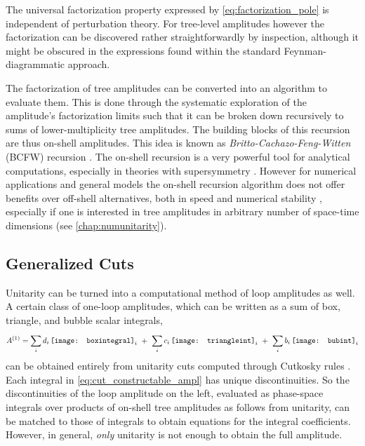 The universal factorization  property expressed by \cref{eq:factorization_pole} is independent of perturbation theory. 
For tree-level amplitudes however the factorization can be discovered rather straightforwardly by inspection,
although it might be obscured in the expressions found within the standard Feynman-diagrammatic approach.

The factorization of tree amplitudes can be converted into an algorithm to evaluate them.
This is done through the systematic exploration of the amplitude's factorization limits such that
it can be broken down recursively to sums of lower-multiplicity tree amplitudes. 
The building blocks of this recursion are thus on-shell amplitudes.
This idea is known as \emph{Britto-Cachazo-Feng-Witten} (BCFW) recursion \cite{Britto2005c,Britto2005f}.
The on-shell recursion is a very powerful tool for analytical computations, especially 
in theories with supersymmetry \cite{Dixon:2010ik,Drummond:2008cr,Bourjaily:2010wh}.
However for numerical applications and general models the on-shell recursion algorithm
does not offer benefits over off-shell alternatives, both in speed and numerical stability \cite{Duhr:2006iq,Drummond:2008cr,Badger:2012uz},
especially if one is interested in tree amplitudes in arbitrary number of space-time dimensions (see \cref{chap:numunitarity}). 


\subsection{Generalized Cuts}

Unitarity can be turned into a computational method of loop amplitudes as well.
A certain class of one-loop amplitudes, which
can be written as a sum of box, triangle, and bubble scalar integrals,
\begin{equation} \label{eq:cut_constructable_ampl}
  A^{(1)} = \sum_i d_{i}\,\vcenter{\hbox{\texttt{[image: boxintegral]}}}_i~+~
  \sum_{i}^{} c_{i}\,\vcenter{\hbox{\texttt{[image: triangleint]}}}_i~+~
  \sum_i b_{i}\,\vcenter{\hbox{\texttt{[image: bubint]}}}_i
\end{equation}
can be obtained entirely from unitarity cuts computed through Cutkosky rules \cite{Bern:1994cg,Bern:1994zx}.
Each integral in \cref{eq:cut_constructable_ampl} has unique discontinuities.
So the discontinuities of the loop amplitude on the left, 
evaluated as phase-space integrals over products of on-shell tree amplitudes as follows from unitarity,
can be matched to those of integrals to obtain equations for the integral coefficients.
However, in general, \emph{only} unitarity is not enough to obtain the full amplitude.

